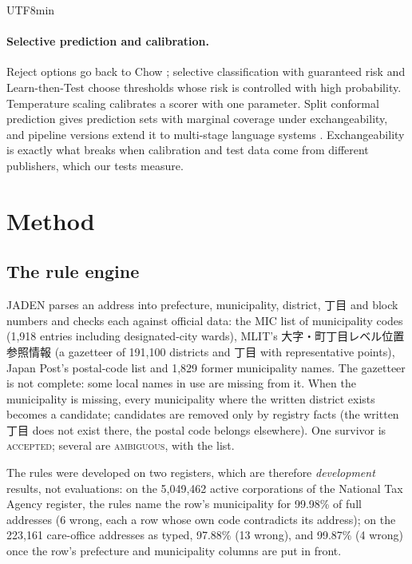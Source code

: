 \documentclass[10pt]{article}
\begin{document}
\begin{CJK}{UTF8}{min}
\paragraph{Selective prediction and calibration.} Reject options go back to Chow \cite{chow}; selective
classification with guaranteed risk \cite{geifman} and Learn-then-Test \cite{ltt} choose thresholds whose
risk is controlled with high probability. Temperature scaling \cite{guo} calibrates a scorer with one
parameter. Split conformal prediction \cite{vovk,angelopoulos} gives prediction sets with marginal
coverage under exchangeability, and pipeline versions extend it to multi-stage language systems
\cite{pasc}. Exchangeability is exactly what breaks when calibration and test data come from different
publishers, which our tests measure.

\section{Method}\label{sec:method}

\subsection{The rule engine}
JADEN parses an address into prefecture, municipality, district, 丁目 and block numbers and checks each
against official data: the MIC list of municipality codes (1,918 entries including designated-city
wards), MLIT's 大字・町丁目レベル位置参照情報 (a gazetteer of 191,100 districts and 丁目 with
representative points), Japan Post's postal-code list and 1,829 former municipality names. The gazetteer
is not complete: some local names in use are missing from it. When the municipality is missing, every
municipality where the written district exists becomes a candidate; candidates are removed only by
registry facts (the written 丁目 does not exist there, the postal code belongs elsewhere). One survivor
is \textsc{accepted}; several are \textsc{ambiguous}, with the list.

The rules were developed on two registers, which are therefore \emph{development} results, not
evaluations: on the 5,049,462 active corporations of the National Tax Agency register, the rules name
the row's municipality for 99.98\% of full addresses (6 wrong, each a row whose own code contradicts its
address); on the 223,161 care-office addresses as typed, 97.88\% (13 wrong), and 99.87\% (4 wrong) once
the row's prefecture and municipality columns are put in front.


\end{CJK}
\end{document}
